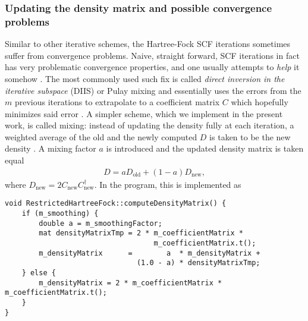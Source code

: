 \documentclass[../../master.tex]{subfiles}
\begin{document}
\subsubsection{Updating the density matrix and possible convergence problems}
Similar to other iterative schemes, the Hartree-Fock SCF iterations sometimes suffer from convergence problems. Naive, straight forward, SCF iterations in fact has very problematic convergence properties, and one usually attempts to \emph{help} it somehow \cite{kvaal}. The most commonly used such fix is called \emph{direct inversion in the iterative subspace} (DIIS) or Pulay mixing and essentially uses the errors from the $m$ previous iterations to extrapolate to a coefficient matrix $C$ which hopefully minimizes said error \cite{pulay}. A simpler scheme, which we implement in the present work, is called mixing: instead of updating the density fully at each iteration, a weighted average of the old and the newly computed $D$ is taken to be the new density \cite{thijssen}. A mixing factor $a$ is introduced and the updated density matrix is taken equal 
\begin{align}
D=aD_\text{old}+(1-a)D_\text{new},
\end{align}
where $D_\text{new}=2C_\text{new}C_{\text{new}}^\dagger$. In the program, this is implemented as
\begin{lstlisting}[language={[std]c++}]
void RestrictedHartreeFock::computeDensityMatrix() {
    if (m_smoothing) {
        double a = m_smoothingFactor;
        mat densityMatrixTmp = 2 * m_coefficientMatrix *
                                   m_coefficientMatrix.t();
        m_densityMatrix      =        a  * m_densityMatrix + 
                               (1.0 - a) * densityMatrixTmp;
    } else {
        m_densityMatrix = 2 * m_coefficientMatrix * m_coefficientMatrix.t();
    }
}
\end{lstlisting}


%
%
%
%
%
\end{document}

